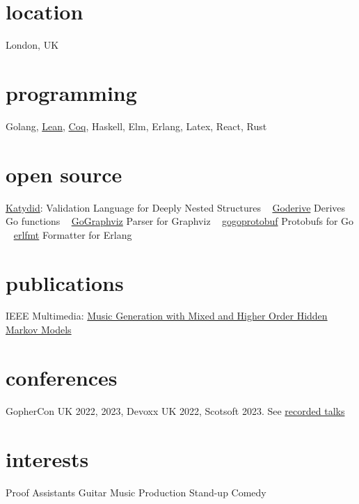 \documentclass[print]{friggeri-cv-a4} %
\begin{document}

\begin{aside} %
\section{location}
London, UK
\section{programming}
Golang, \href{https://leanprover.github.io/}{Lean}, \href{https://coq.inria.fr/}{Coq}, Haskell, Elm, Erlang, Latex, React, Rust
\section{open source}
\href{https://katydid.github.io}{Katydid}:
Validation Language for Deeply Nested Structures
~
\href{https://github.com/awalterschulze/goderive}{Goderive} 
Derives Go functions
~
\href{https://github.com/awalterschulze/gographviz}{GoGraphviz} 
Parser for Graphviz
~
\href{https://github.com/gogo/protobuf}{gogoprotobuf} 
Protobufs for Go 
~
\href{https://github.com/WhatsApp/erlfmt}{erlfmt}  
Formatter for Erlang
\section{publications}
IEEE Multimedia: \href{http://doi.ieeecomputersociety.org/10.1109/MMUL.2010.44}{Music Generation with Mixed and Higher Order Hidden Markov Models}
\section{conferences}
GopherCon UK 2022, 2023, Devoxx UK 2022, Scotsoft 2023.
See \href{https://www.youtube.com/playlist?list=PLYwF9EIrl42T3ml_ANaNifOuTQtLxaZgQ}{\faYoutubePlay recorded talks}
\section{interests}
Proof Assistants
Guitar
Music Production
Stand-up Comedy
\end{aside}
\end{document}
